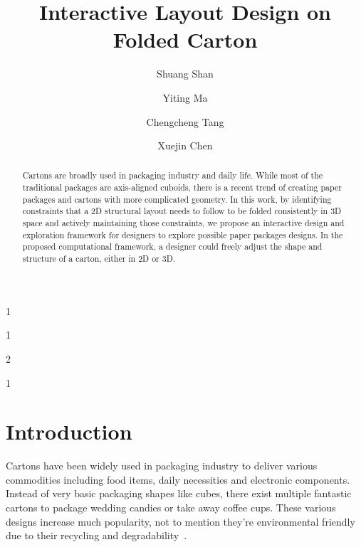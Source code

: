 \documentclass[submission]{gmp2018}
\begin{document}
%
%
\title{Interactive Layout Design on Folded Carton}

%
%
\SubNumber{{\color{red}{XXX}}}

%
%
\author{Shuang Shan}{1}
\author{Yiting Ma}{1}
\author{Chengcheng Tang}{2}
\author{Xuejin Chen}{1}

%
%

%
%


\maketitle

\begin{abstract}
Cartons are broadly used in packaging industry and daily life. While most of the traditional packages are axis-aligned cuboids, there is a recent trend of creating paper packages and cartons with more complicated geometry. In this work, by identifying constraints that a 2D structural layout needs to follow to be folded consistently in 3D space and actively maintaining those constraints, we propose an interactive design and exploration framework for designers to explore possible paper packages designs. In the proposed computational framework, a designer could freely adjust the shape and structure of a carton, either in 2D or 3D.  
\end{abstract}


\section{Introduction}
Cartons have been widely used in packaging industry to deliver various commodities including food items, daily necessities and electronic components. Instead of very basic packaging shapes like cubes, there exist multiple fantastic cartons to package wedding candies or take away coffee cups. These various designs increase much popularity, not to mention they're environmental friendly due to their recycling and degradability~\cite{Mullineux:2010:CSC:1739328.1739673}.
\end{document}

